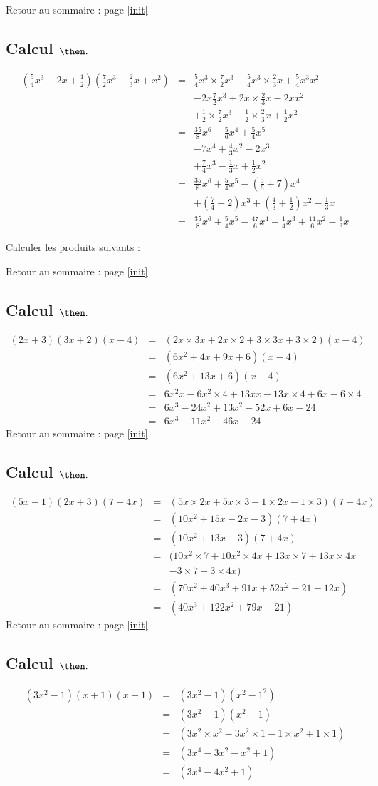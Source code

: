 \documentclass[14pt]{article}
\theoremstyle{remark}
\newcounter{n}
\renewcommand{\it}{Retour au sommaire : page \ref{init}
	\subsection{Calcul $ \mathbf{ \then}.$}\label{\then} \stepcounter{n} }
\theoremstyle{plain}
\begin{document}
\it \begin{eqnarray*}\left(\frac54x^3-2x+\frac12\right)\left(\frac72x^3-\frac23x+x^2\right)&=& 
\frac54x^3\times\frac72x^3-\frac54x^3\times\frac23x+\frac54x^3x^2
\\
&&-2x\frac72x^3 +2x\times \frac23x-2xx^2\\
&&+\frac12\times\frac72x^3-\frac12\times\frac23x+\frac12x^2\\
&=& \frac{35}8x^6 -\frac56x^4 +\frac54x^5\\
&& -7x^4 +\frac43x^2-2x^3\\
&&+\frac74x^3-\frac13x+\frac12x^2\\
&=& \frac{35}8x^6 +\frac54x^5 -\left(\frac56+7\right)x^4 \\
&&+\left(\frac74-2\right)x^3 +\left(\frac43+\frac12\right)x^2-\frac13x\\
&=& \frac{35}8x^6 +\frac54x^5 - \frac{47}6x^4-\frac14x^3+\frac{11}6x^2-\frac13x
\end{eqnarray*} 

 Calculer les produits suivants : 
 
\it \begin{eqnarray*}(2x+3)(3x+2)(x-4)&=& (2x\times3x+2x\times 2 +3\times 3x+3\times2)(x-4)\\
&=& (6x^2+4x+9x+6)(x-4)\\
&=& (6x^2+13x+6)(x-4)\\
&=& 6x^2x -6x^2\times 4 +13xx -13x\times 4 +6x-6\times 4\\
&=& 6x^3 -24x^2 +13x^2-52x+6x-24\\
&=& 6x^3-11x^2-46x-24\end{eqnarray*}
\it \begin{eqnarray*}(5x-1)(2x+3)(7+4x) &=& 
(5x\times2x+5x\times3-1\times 2x-1\times 3)(7+4x)\\
&=& (10x^2+15x-2x-3)(7+4x)\\
&=& (10x^2+13x-3)(7+4x)\\
&=&(10x^2\times 7 + 10x^2\times4x
+13x\times 7 + 13x\times 4x\\
&&-3\times 7 - 3\times 4x)\\
&=& (70x^2 +40x^3+91x+52x^2-21-12x)\\
&=& (40x^3+122x^2+79x-21)
\end{eqnarray*}
\it \begin{eqnarray*}
(3x^2-1)(x+1)(x-1) 
&=& (3x^2-1)(x^2-1^2)\\
&=& (3x^2-1)(x^2-1)\\
&=& (3x^2\times x^2-3x^2\times 1 
- 1\times x^2 +1\times 1)\\
&=& (3x^4-3x^2-x^2+1)\\
&=& (3x^4-4x^2+1)
\end{eqnarray*}
\end{document}
